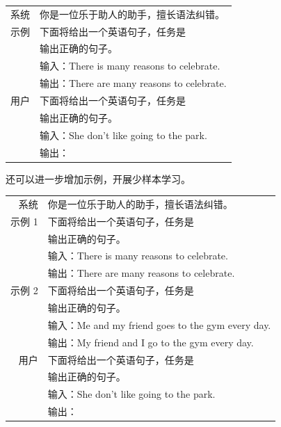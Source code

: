 \vspace{0.5em}
\begin{tcolorbox}

\begingroup
\renewcommand{\arraystretch}{1.0}
\setlength{\tabcolsep}{6pt}
\begin{tabular}{r l}
{\color{gray} \footnotesize{系统}} & 你是一位乐于助人的助手，擅长语法纠错。 \\ [0.2cm]
{\color{gray} \footnotesize{示例}}  & 下面将给出一个英语句子，任务是 \\
 & 输出正确的句子。 \\ [0.1cm]
 & 输入：There is many reasons to celebrate. \\
 & 输出：There are many reasons to celebrate. \\ [0.2cm]
{\color{gray} \footnotesize{用户}}  & 下面将给出一个英语句子，任务是 \\
 & 输出正确的句子。 \\ [0.1cm]
 & 输入：She don't like going to the park. \\
 & 输出：\underline{\hspace{2em}}
\end{tabular}
\endgroup

\end{tcolorbox}
\vspace{0.5em}

还可以进一步增加示例，开展少样本学习。

\vspace{0.5em}
\begin{tcolorbox}

\begingroup
\renewcommand{\arraystretch}{1.0}
\setlength{\tabcolsep}{6pt}
\begin{tabular}{r l}
{\color{gray} \footnotesize{系统}} & 你是一位乐于助人的助手，擅长语法纠错。 \\ [0.2cm]
{\color{gray} \footnotesize{示例 1}}  & 下面将给出一个英语句子，任务是 \\
 & 输出正确的句子。 \\ [0.1cm]
 & 输入：There is many reasons to celebrate. \\
 & 输出：There are many reasons to celebrate. \\ [0.2cm]
{\color{gray} \footnotesize{示例 2}}  & 下面将给出一个英语句子，任务是 \\
 & 输出正确的句子。 \\ [0.1cm]
 & 输入：Me and my friend goes to the gym every day. \\
 & 输出：My friend and I go to the gym every day. \\ [0.2cm]
{\color{gray} \footnotesize{用户}}  & 下面将给出一个英语句子，任务是 \\
 & 输出正确的句子。 \\ [0.1cm]
 & 输入：She don't like going to the park. \\
 & 输出：\underline{\hspace{2em}}
\end{tabular}
\endgroup

\end{tcolorbox}
\vspace{0.5em}

